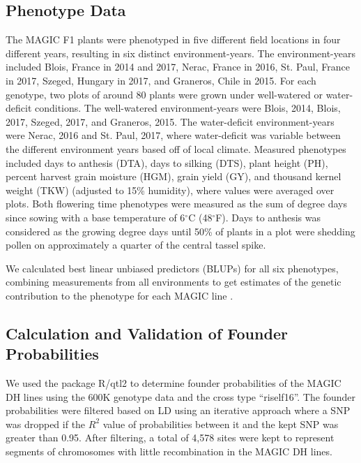 \documentclass[article,9pt,twocolumn,twoside]{rilabRxiv}
\begin{document}
\subsection{Phenotype Data}
The MAGIC F1 plants were phenotyped in five different field locations in four different years, resulting in six distinct environment-years.
The environment-years included Blois, France in 2014 and 2017, Nerac, France in 2016, St. Paul, France in 2017, Szeged, Hungary in 2017, and Graneros, Chile in 2015.
For each genotype, two plots of around 80 plants were grown under well-watered or water-deficit conditions.
The well-watered environment-years were Blois, 2014, Blois, 2017, Szeged, 2017, and Graneros, 2015.
The water-deficit environment-years were Nerac, 2016 and St. Paul, 2017, where water-deficit was variable between the different environment years based off of local climate.
Measured phenotypes included days to anthesis (DTA), days to silking (DTS), plant height (PH), percent harvest grain moisture (HGM), grain yield (GY), and thousand kernel weight (TKW) (adjusted to 15\% humidity), where values were averaged over plots.
Both flowering time phenotypes were measured as the sum of degree days since sowing with a base temperature of 6$^{\circ}$C (48$^{\circ}$F).
Days to anthesis was considered as the growing degree days until 50\% of plants in a plot were shedding pollen on approximately a quarter of the central tassel spike.

We calculated best linear unbiased predictors (BLUPs) for all six phenotypes, combining measurements from all environments to get estimates of the genetic contribution to the phenotype for each MAGIC line \cite{Aulchenko}.


\subsection{Calculation and Validation of Founder Probabilities}
We used the package R/qtl2 \citep{Broman} to determine founder probabilities of the MAGIC DH lines using the 600K genotype data and the cross type ``riself16''.
The founder probabilities were filtered based on LD using an iterative approach where a SNP was dropped if the $R^2$ value of probabilities between it and the kept SNP was greater than 0.95.
After filtering, a total of 4,578 sites were kept to represent segments of chromosomes with little recombination in the MAGIC DH lines.
\end{document}
